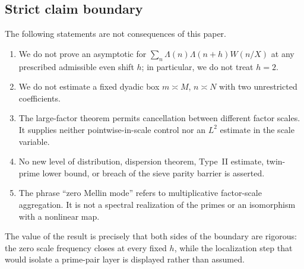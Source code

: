 \subsection{Strict claim boundary}

The following statements are not consequences of this paper.
\begin{enumerate}[label=\textbf{B\arabic*.},leftmargin=3.1em]
 \item We do not prove an asymptotic for
$\sum_n\Lambda(n)\Lambda(n+h)W(n/X)$ at any prescribed admissible even
shift $h$; in particular, we do not treat $h=2$.
 \item We do not estimate a fixed dyadic box
 $m\asymp M$, $n\asymp N$ with two unrestricted coefficients.
 \item The large-factor theorem permits cancellation between different
 factor scales.  It supplies neither pointwise-in-scale control nor an
 $L^2$ estimate in the scale variable.
 \item No new level of distribution, dispersion theorem, Type~II estimate,
 twin-prime lower bound, or breach of the sieve parity barrier is asserted.
 \item The phrase ``zero Mellin mode'' refers to multiplicative factor-scale
 aggregation.  It is not a spectral realization of the primes or an
 isomorphism with a nonlinear map.
\end{enumerate}

The value of the result is precisely that both sides of the boundary are
rigorous: the zero scale frequency closes at every fixed $h$, while the
localization step that would isolate a prime-pair layer is displayed rather
than assumed.
